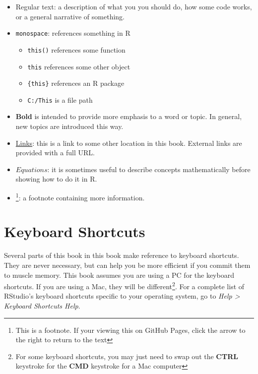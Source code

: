 \documentclass[]{book}
\providecommand{\tightlist}{%
  \setlength{\itemsep}{0pt}\setlength{\parskip}{0pt}}
\let\rmarkdownfootnote\footnote%
\def\footnote{\protect\rmarkdownfootnote}
\theoremstyle{definition}
\theoremstyle{definition}
\theoremstyle{definition}
\theoremstyle{remark}
\begin{document}
\begin{itemize}
\tightlist
\item
  Regular text: a description of what you you should do, how some code
  works, or a general narrative of something.
\item
  \texttt{monospace}: references something in R

  \begin{itemize}
  \tightlist
  \item
    \texttt{this()} references some function
  \item
    \texttt{this} references some other object
  \item
    \texttt{\{this\}} references an R package
  \item
    \texttt{C:/This} is a file path
  \end{itemize}
\item
  \textbf{Bold} is intended to provide more emphasis to a word or topic.
  In general, new topics are introduced this way.
\item
  \protect\hyperlink{notation}{Links}: this is a link to some other
  location in this book. External links are provided with a full URL.
\item
  \(Equations\): it is sometimes useful to describe concepts
  mathematically before showing how to do it in R.
\item
  \footnote{This is a footnote. If your viewing this on GitHub Pages,
    click the arrow to the right to return to the text}: a footnote
  containing more information.
\end{itemize}

\section*{Keyboard Shortcuts}\label{keyboard-shortcuts}

Several parts of this book in this book make reference to keyboard
shortcuts. They are never necessary, but can help you be more efficient
if you commit them to muscle memory. This book assumes you are using a
PC for the keyboard shortcuts. If you are using a Mac, they will be
different\footnote{For some keyboard shortcuts, you may just need to
  swap out the \textbf{CTRL} keystroke for the \textbf{CMD} keystroke
  for a Mac computer}. For a complete list of RStudio's keyboard
shortcuts specific to your operating system, go to \emph{Help
\textgreater{} Keyboard Shortcuts Help}.
\end{document}
